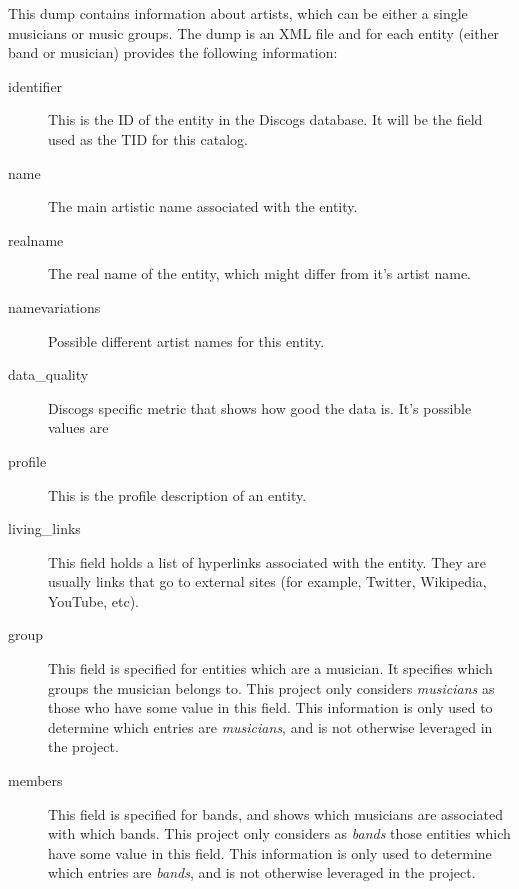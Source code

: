 \documentclass[epsfig,a4paper,11pt,titlepage,twoside,openany]{book}
\begin{document}
This dump contains information about artists, which can be either a single musicians or music groups. The dump is an XML file and for each entity (either band or musician) provides the following information:

\begin{description}
\item[identifier] This is the ID of the entity in the Discogs database. It will be the field used as the TID for this catalog.

\item[name] The main artistic name associated with the entity.

\item[realname] The real name of the entity, which might differ from it's artist name.

\item[namevariations] Possible different artist names for this entity.

\item[data\_quality] Discogs specific metric that shows how good the data is. It's possible values are 

\item[profile] This is the profile description of an entity.

\item[living\_links] This field holds a list of hyperlinks associated with the entity. They are usually links that go to external sites (for example, Twitter, Wikipedia, YouTube, etc).

\item[group] This field is specified for entities which are a musician. It specifies which groups the musician belongs to. This project only considers \textit{musicians} as those who have some value in this field. This information is only used to determine which entries are \textit{musicians}, and is not otherwise leveraged in the project. 

\item[members] This field is specified for bands, and shows which musicians are associated with which bands. This project  only considers as \textit{bands} those entities which have some value in this field. This information is only used to determine which entries are \textit{bands}, and is not otherwise leveraged in the project.

\end{description}
\end{document}
